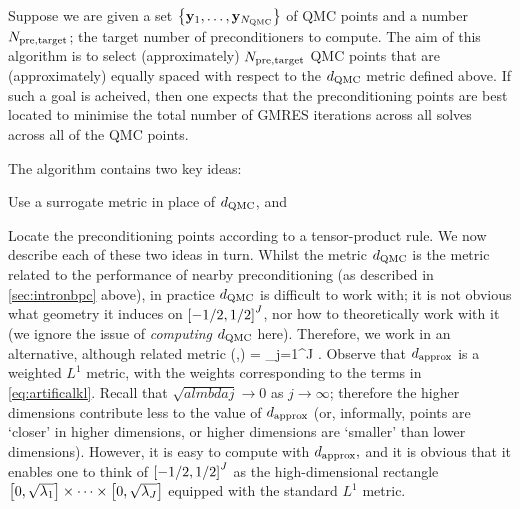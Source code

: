 Suppose we are given a set $\set{\byo,\ldots,\byNQMC}$ of QMC points and a number $N_{\mathrm{pre,target}}$; the target number of preconditioners to compute. The aim of this algorithm is to select (approximately) $N_{\mathrm{pre,target}}$ QMC points that are (approximately) equally spaced with respect to the $d_{\mathrm{QMC}}$ metric defined above. If such a goal is acheived, then one expects that the preconditioning points are best located to minimise the total number of GMRES iterations across all solves across all of the QMC points.

The algorithm contains two key ideas:
\ben
  \item Use a surrogate metric in place of $d_{\mathrm{QMC}}$, and
\item Locate the preconditioning points according to a tensor-product rule.
  \een
  We now describe each of these two ideas in turn.
  Whilst the metric $d_{\mathrm{QMC}}$ is the metric related to the performance of nearby preconditioning (as described in \cref{sec:intronbpc} above), in practice $d_{\mathrm{QMC}}$ is difficult to work with; it is not obvious what geometry it induces on $\cube{J}$, nor how to theoretically work with it (we ignore the issue of \emph{computing} $d_{\mathrm{QMC}}$ here). Therefore, we work in an alternative, although related metric
  \beqs
\dapprox(\byo,\by) = \sum_{j=1}^{J} \sqrt{\lambdaj} .
\eeqs
Observe that $d_{\mathrm{approx}}$ is a weighted $L^1$ metric, with the weights corresponding to the terms in \cref{eq:artificalkl}. Recall that $\sqrt{almbdaj} \rightarrow 0$ as $j \rightarrow \infty$; therefore the higher dimensions contribute less to the value of $d_{\mathrm{approx}}$ (or, informally, points are `closer' in higher dimensions, or higher dimensions are `smaller' than lower dimensions). However, it is easy to compute with $d_{\mathrm{approx}},$ and it is obvious that it enables one to think of $\cube{J}$ as the high-dimensional rectangle $\mleft[0,\sqrt{\lambdao}\mright]\times\cdots\times\mleft[0,\sqrt{\lambdaJ}\mright]$ equipped with the standard $L^1$ metric.

